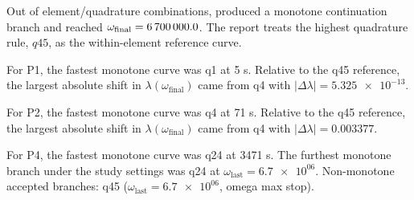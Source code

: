 Out of \StudyRunCount{} element/quadrature combinations, \StudyMonotoneRunCount{} produced a monotone continuation branch and \StudyStableRunCount{} reached $\omega_{\mathrm{final}} = \num{6700000.0}$. The report treats the highest quadrature rule, $q45$, as the within-element reference curve.

For P1, the fastest monotone curve was q1 at \num{5} s. Relative to the q45 reference, the largest absolute shift in $\lambda(\omega_{\mathrm{final}})$ came from q4 with $|\Delta\lambda| = \num{5.325e-13}$.

For P2, the fastest monotone curve was q4 at \num{71} s. Relative to the q45 reference, the largest absolute shift in $\lambda(\omega_{\mathrm{final}})$ came from q4 with $|\Delta\lambda| = \num{0.003377}$.

For P4, the fastest monotone curve was q24 at \num{3471} s. The furthest monotone branch under the study settings was q24 at $\omega_{\mathrm{last}} = \num{6.7e+06}$. Non-monotone accepted branches: q45 ($\omega_{\mathrm{last}} = \num{6.7e+06}$, omega max stop).
